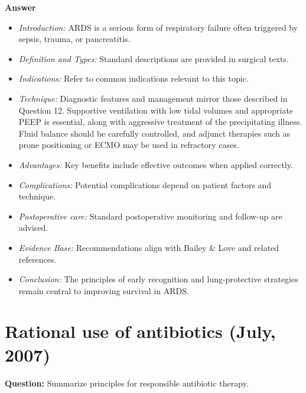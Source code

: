 \documentclass{article}
\begin{document}
\textbf{Answer}
\begin{itemize}

\item \emph{Introduction:} ARDS is a serious form of respiratory failure often triggered by sepsis, trauma, or pancreatitis.
\item \emph{Definition and Types:} Standard descriptions are provided in surgical texts.
\item \emph{Indications:} Refer to common indications relevant to this topic.

\item \emph{Technique:} Diagnostic features and management mirror those described in Question 12. Supportive ventilation with low tidal volumes and appropriate PEEP is essential, along with aggressive treatment of the precipitating illness. Fluid balance should be carefully controlled, and adjunct therapies such as prone positioning or ECMO may be used in refractory cases.
\item \emph{Advantages:} Key benefits include effective outcomes when applied correctly.
\item \emph{Complications:} Potential complications depend on patient factors and technique.
\item \emph{Postoperative care:} Standard postoperative monitoring and follow-up are advised.
\item \emph{Evidence Base:} Recommendations align with Bailey \& Love and related references.

\item \emph{Conclusion:} The principles of early recognition and lung-protective strategies remain central to improving survival in ARDS.


\end{itemize}

\section{Rational use of antibiotics (July, 2007)}

\textbf{Question:} Summarize principles for responsible antibiotic therapy.
\end{document}
